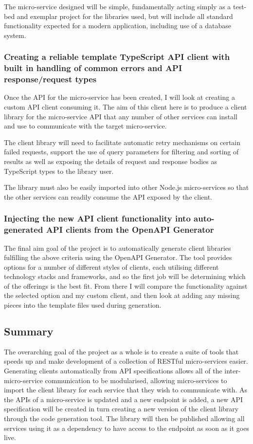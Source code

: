 The micro-service designed will be simple, fundamentally acting simply as a test-bed and exemplar project for the libraries used, but will include all standard functionality expected for a modern application, including use of a database system.

\subsubsection{Creating a reliable template TypeScript API client with built in handling of common errors and API response/request types }
Once the API for the micro-service has been created, I will look at creating a custom API client consuming it. The aim of this client here is to produce a client library for the micro-service API that any number of other services can install and use to communicate with the target micro-service.

The client library will need to facilitate automatic retry mechanisms on certain failed requests, support the use of query parameters for filtering and sorting of results as well as exposing the details of request and response bodies as TypeScript types to the library user.

The library must also be easily imported into other Node.js micro-services so that the other services can readily consume the API exposed by the client.

\subsubsection{Injecting the new API client functionality into auto-generated API clients from the OpenAPI Generator}

The final aim goal of the project is to automatically generate client libraries fulfilling the above criteria using the OpenAPI Generator. The tool provides options for a number of different styles of clients, each utilising different technology stacks and frameworks, and so the first job will be determining which of the offerings is the best fit. From there I will compare the functionality against the selected option and my custom client, and then look at adding any missing pieces into the template files used during generation.

\subsection{Summary}
The overarching goal of the project as a whole is to create a suite of tools that speeds up and make development of a collection of RESTful micro-services easier. Generating clients automatically from API specifications allows all of the inter-micro-service communication to be modularised, allowing micro-services to import the client library for each service that they wish to communicate with. As the APIs of a micro-service is updated and a new endpoint is added, a new API specification will be created in turn creating a new version of the client library through the code generation tool. The library will then be published allowing all services using it as a dependency to have access to the endpoint as soon as it goes live.

